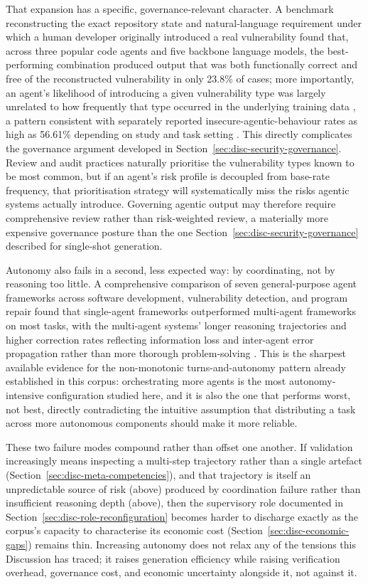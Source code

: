That expansion has a specific, governance-relevant character. A benchmark reconstructing the exact repository state and natural-language requirement under which a human developer originally introduced a real vulnerability found that, across three popular code agents and five backbone language models, the best-performing combination produced output that was both functionally correct and free of the reconstructed vulnerability in only 23.8\% of cases; more importantly, an agent's likelihood of introducing a given vulnerability type was largely unrelated to how frequently that type occurred in the underlying training data \cite{chen_securevibebench_2026}, a pattern consistent with separately reported insecure-agentic-behaviour rates as high as 56.61\% depending on study and task setting \cite{kozak_when_2025}. This directly complicates the governance argument developed in Section~\ref{sec:disc-security-governance}. Review and audit practices naturally prioritise the vulnerability types known to be most common, but if an agent's risk profile is decoupled from base-rate frequency, that prioritisation strategy will systematically miss the risks agentic systems actually introduce. Governing agentic output may therefore require comprehensive review rather than risk-weighted review, a materially more expensive governance posture than the one Section~\ref{sec:disc-security-governance} described for single-shot generation.

Autonomy also fails in a second, less expected way: by coordinating, not by reasoning too little. A comprehensive comparison of seven general-purpose agent frameworks across software development, vulnerability detection, and program repair found that single-agent frameworks outperformed multi-agent frameworks on most tasks, with the multi-agent systems' longer reasoning trajectories and higher correction rates reflecting information loss and inter-agent error propagation rather than more thorough problem-solving \cite{yin_comprehensive_2025}. This is the sharpest available evidence for the non-monotonic turns-and-autonomy pattern already established in this corpus: orchestrating more agents is the most autonomy-intensive configuration studied here, and it is also the one that performs worst, not best, directly contradicting the intuitive assumption that distributing a task across more autonomous components should make it more reliable.

These two failure modes compound rather than offset one another. If validation increasingly means inspecting a multi-step trajectory rather than a single artefact (Section~\ref{sec:disc-meta-competencies}), and that trajectory is itself an unpredictable source of risk (above) produced by coordination failure rather than insufficient reasoning depth (above), then the supervisory role documented in Section~\ref{sec:disc-role-reconfiguration} becomes harder to discharge exactly as the corpus's capacity to characterise its economic cost (Section~\ref{sec:disc-economic-gaps}) remains thin. Increasing autonomy does not relax any of the tensions this Discussion has traced; it raises generation efficiency while raising verification overhead, governance cost, and economic uncertainty alongside it, not against it.

